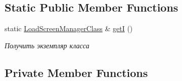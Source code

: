 \subsection*{Static Public Member Functions}
\begin{DoxyCompactItemize}
\item 
static \hyperlink{class_load_screen_manager_class}{Load\+Screen\+Manager\+Class} \& \hyperlink{class_load_screen_manager_class_afd2c1e2905d518a3b1f307de9d598911}{getI} ()
\begin{DoxyCompactList}\small\item\em Получить экземпляр класса \end{DoxyCompactList}\end{DoxyCompactItemize}
\subsection*{Private Member Functions}
